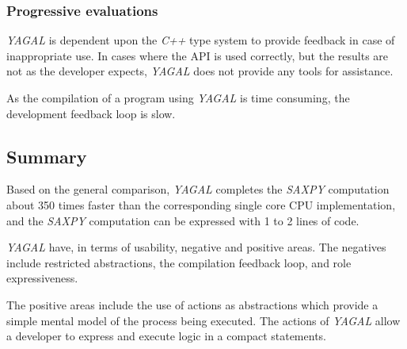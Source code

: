 \subsubsection[*]{Progressive evaluations}
\textit{YAGAL} is dependent upon the \textit{C++} type system to provide feedback in case of inappropriate use. In cases where the API is used correctly, but the results are not as the developer expects, \textit{YAGAL} does not provide any tools for assistance.

As the compilation of a program using \textit{YAGAL} is time consuming, the development feedback loop is slow.

\subsection{Summary}
Based on the general comparison, \textit{YAGAL} completes the \textit{SAXPY} computation about 350 times faster than the corresponding single core CPU implementation, and the \textit{SAXPY} computation can be expressed with 1 to 2 lines of code. 

\textit{YAGAL} have, in terms of usability, negative and positive areas. The negatives include restricted abstractions, the compilation feedback loop, and role expressiveness.

The positive areas include the use of actions as abstractions which provide a simple mental model of the process being executed. The actions of \textit{YAGAL} allow a developer to express and execute  logic in a compact statements.
